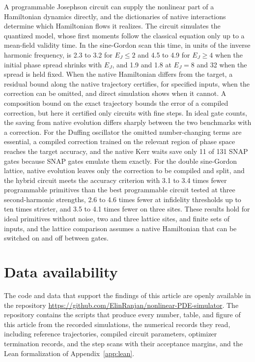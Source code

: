 \documentclass[pra,twocolumn,superscriptaddress,nofootinbib,floatfix]{revtex4-2}
\theoremstyle{remark}
\newcommand{\revcolor}{\color{blue}}
\DeclareRobustCommand{\rev}[1]{{\revcolor #1}}
\begin{document}
\rev{A programmable Josephson circuit can supply the nonlinear part of a Hamiltonian dynamics directly, and the dictionaries of native interactions determine which Hamiltonian flows it realizes.} \rev{The circuit simulates the quantized model, whose first moments follow the classical equation only up to a mean-field validity time.} \rev{In the sine-Gordon scan this time, in units of the inverse harmonic frequency, is 2.3 to 3.2 for \(E_J\le2\) and 4.5 to 4.9 for \(E_J\ge4\) when the initial phase spread shrinks with \(E_J\), and 1.9 and 1.8 at \(E_J=8\) and 32 when the spread is held fixed.} \rev{When the native Hamiltonian differs from the target, a residual bound along the native trajectory certifies, for specified inputs, when the correction can be omitted, and direct simulation shows when it cannot.} \rev{A composition bound on the exact trajectory bounds the error of a compiled correction, but here it certified only circuits with fine steps.} \rev{In ideal gate counts, the saving from native evolution differs sharply between the two benchmarks with a correction.} \rev{For the Duffing oscillator the omitted number-changing terms are essential, a compiled correction trained on the relevant region of phase space reaches the target accuracy, and the native Kerr waits save only 11 of 131 SNAP gates because SNAP gates emulate them exactly.} \rev{For the double sine-Gordon lattice, native evolution leaves only the correction to be compiled and split, and the hybrid circuit meets the accuracy criterion with 3.1 to 3.4 times fewer programmable primitives than the best programmable circuit tested at three second-harmonic strengths, 2.6 to 4.6 times fewer at infidelity thresholds up to ten times stricter, and 3.5 to 4.1 times fewer on three sites.} \rev{These results hold for ideal primitives without noise, two and three lattice sites, and finite sets of inputs, and the lattice comparison assumes a native Hamiltonian that can be switched on and off between gates.}

\section*{\rev{Data availability}}
\rev{The code and data that support the findings of this article are openly available in the repository \url{https://github.com/ElinRanjan/nonlinear-PDE-simulator}.} \rev{The repository contains the scripts that produce every number, table, and figure of this article from the recorded simulations, the numerical records they read, including reference trajectories, compiled circuit parameters, optimizer termination records, and the step scans with their acceptance margins, and the Lean formalization of Appendix~\ref{app:lean}.}
\end{document}
